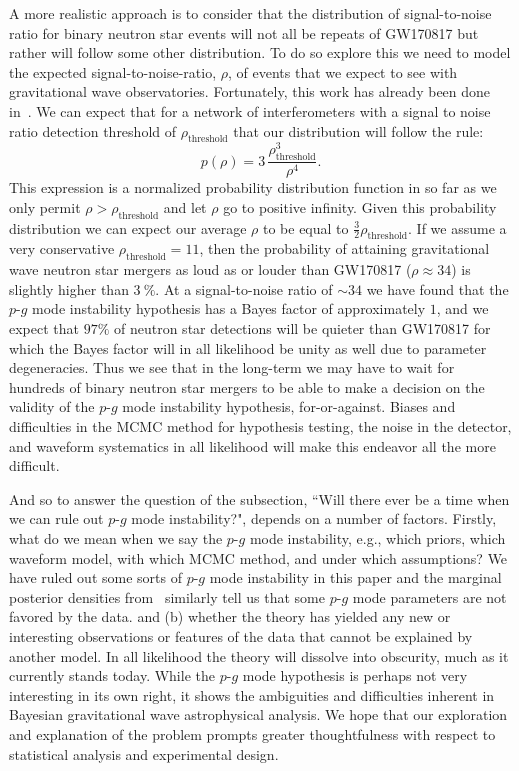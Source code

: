 A more realistic approach is to consider that the distribution of signal-to-noise ratio for binary neutron star events will not all be repeats of GW170817 but rather will follow some other distribution. To do so explore this we need to model the expected signal-to-noise-ratio, $\rho$, of events that we expect to see with gravitational wave observatories. Fortunately, this work has already been done in~\cite{schutz2011networks, chen2014loudest}. We can expect that for a network of interferometers with a signal to noise ratio detection threshold of $\rho_{\mathrm{threshold}}$ that our distribution will follow the rule:
\begin{equation}\label{eqn:universal_snr}
    p(\rho) = 3 \, \frac{\rho_{\mathrm{threshold}}^3}{\rho^4}.
\end{equation}
This expression is a normalized probability distribution function in so far as we only permit $\rho > \rho_{\mathrm{threshold}}$ and let $\rho$ go to positive infinity. Given this probability distribution we can expect our average $\rho$ to be equal to $\frac{3}{2} \rho_{\mathrm{threshold}}$. If we assume a very conservative $\rho_{\mathrm{threshold}} = 11$, then the probability of attaining gravitational wave neutron star mergers as loud as or louder than GW170817 ($\rho \approx 34$) is slightly higher than $3~\%$. At a signal-to-noise ratio of $\sim 34$ we have found that the $p$-$g$ mode instability hypothesis has a Bayes factor of approximately $1$, and we expect that $97 \%$ of neutron star detections will be quieter than GW170817 for which the Bayes factor will in all likelihood be unity as well due to parameter degeneracies. Thus we see that in the long-term we may have to wait for hundreds of binary neutron star mergers to be able to make a decision on the validity of the $p$-$g$ mode instability hypothesis, for-or-against. Biases and difficulties in the MCMC method for hypothesis testing, the noise in the detector, and waveform systematics in all likelihood will make this endeavor all the more difficult.

And so to answer the question of the subsection, ``Will there ever be a time when we can rule out $p$-$g$ mode instability?", depends on a number of factors. Firstly, what do we mean when we say the $p$-$g$ mode instability, e.g., which priors, which waveform model, with which MCMC method, and under which assumptions? We have ruled out some sorts of $p$-$g$ mode instability in this paper and the marginal posterior densities from~\cite{abbott2019constraining} similarly tell us that some $p$-$g$ mode parameters are not favored by the data.  and (b) whether the theory has yielded any new or interesting observations or features of the data that cannot be explained by another model. In all likelihood the theory will dissolve into obscurity, much as it currently stands today. While the $p$-$g$ mode hypothesis is perhaps not very interesting in its own right, it shows the ambiguities and difficulties inherent in Bayesian gravitational wave astrophysical analysis. We hope that our exploration and explanation of the problem prompts greater thoughtfulness with respect to statistical analysis and experimental design.
